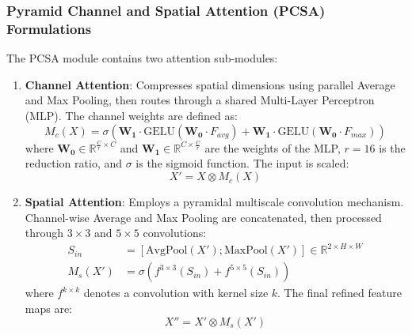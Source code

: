 \documentclass[preprint,12pt]{elsarticle}
\begin{document}
\subsubsection{Pyramid Channel and Spatial Attention (PCSA) Formulations}
The PCSA module contains two attention sub-modules:
\begin{enumerate}
    \item \textbf{Channel Attention}: Compresses spatial dimensions using parallel Average and Max Pooling, then routes through a shared Multi-Layer Perceptron (MLP). The channel weights are defined as:
    \begin{equation}
        M_c(X) = \sigma\left( \mathbf{W_1} \cdot \text{GELU}(\mathbf{W_0} \cdot F_{avg}) + \mathbf{W_1} \cdot \text{GELU}(\mathbf{W_0} \cdot F_{max}) \right)
    \end{equation}
    where $\mathbf{W_0} \in \mathbb{R}^{\frac{C}{r} \times C}$ and $\mathbf{W_1} \in \mathbb{R}^{C \times \frac{C}{r}}$ are the weights of the MLP, $r=16$ is the reduction ratio, and $\sigma$ is the sigmoid function. The input is scaled:
    \begin{equation}
        X' = X \otimes M_c(X)
    \end{equation}
    
    \item \textbf{Spatial Attention}: Employs a pyramidal multiscale convolution mechanism. Channel-wise Average and Max Pooling are concatenated, then processed through $3 \times 3$ and $5 \times 5$ convolutions:
    \begin{align}
        S_{in} &= \left[ \text{AvgPool}(X'); \text{MaxPool}(X') \right] \in \mathbb{R}^{2 \times H \times W} \\
        M_s(X') &= \sigma\left( f^{3\times 3}(S_{in}) + f^{5\times 5}(S_{in}) \right)
    \end{align}
    where $f^{k\times k}$ denotes a convolution with kernel size $k$. The final refined feature maps are:
    \begin{equation}
        X'' = X' \otimes M_s(X')
    \end{equation}
\end{enumerate}
\end{document}
